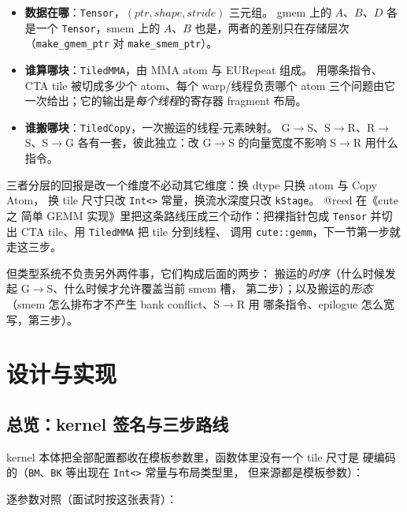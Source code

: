 \begin{itemize}
  \item \textbf{数据在哪}：\texttt{Tensor}，$(ptr, shape, stride)$ 三元组。
        gmem 上的 $A$、$B$、$D$ 各是一个 \texttt{Tensor}，smem 上的 $A$、$B$
        也是，两者的差别只在存储层次（\texttt{make\_\allowbreak{}gmem\_\allowbreak{}ptr} 对
        \texttt{make\_\allowbreak{}smem\_\allowbreak{}ptr}）。
  \item \textbf{谁算哪块}：\texttt{TiledMMA}，由 MMA atom 与 EURepeat 组成。
        用哪条指令、CTA tile 被切成多少个 atom、每个 warp/线程负责哪个 atom
        三个问题由它一次给出；它的输出是\emph{每个线程}的寄存器 fragment 布局。
  \item \textbf{谁搬哪块}：\texttt{TiledCopy}，一次搬运的线程-元素映射。
        G$\to$S、S$\to$R、R$\to$S、S$\to$G 各有一套，彼此独立：改 G$\to$S
        的向量宽度不影响 S$\to$R 用什么指令。
\end{itemize}

三者分层的回报是改一个维度不必动其它维度：换 dtype 只换 atom 与 Copy Atom，
换 tile 尺寸只改 \texttt{Int<>} 常量，换流水深度只改 \texttt{kStage}。
@reed 在《cute 之 简单 GEMM 实现》里把这条路线压成三个动作：把裸指针包成
\texttt{Tensor} 并切出 CTA tile、用 \texttt{TiledMMA} 把 tile 分到线程、
调用 \texttt{cute::gemm}，下一节第一步就走这三步。

但类型系统不负责另外两件事，它们构成后面的两步：
搬运的\emph{时序}（什么时候发起 G$\to$S、什么时候才允许覆盖当前 smem 槽，
第二步）；以及搬运的\emph{形态}（smem 怎么排布才不产生 bank conflict、S$\to$R 用
哪条指令、epilogue 怎么宽写，第三步）。

\section{设计与实现}

\subsection{总览：kernel 签名与三步路线}\label{sec:24-overview}

kernel 本体把全部配置都收在模板参数里，函数体里没有一个 tile 尺寸是
硬编码的（\texttt{BM}、\texttt{BK} 等出现在 \texttt{Int<>} 常量与布局类型里，
但来源都是模板参数）：



逐参数对照（面试时按这张表背）：

